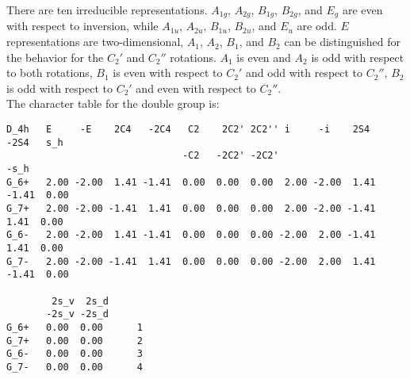 \documentclass[12pt,a4paper,twoside]{report}
\begin{document}
There are ten irreducible representations. $A_{1g}$, $A_{2g}$, $B_{1g}$, 
$B_{2g}$, and $E_g$ are even with respect to inversion, while 
$A_{1u}$, $A_{2u}$, $B_{1u}$, $B_{2u}$, and $E_u$ are odd.
$E$ representations are two-dimensional, $A_1$, $A_2$, $B_1$, and $B_2$ can
be distinguished for the behavior for the $C_2'$ and $C_2''$ rotations.
$A_1$ is even and $A_2$ is odd with respect to both rotations, 
$B_1$ is even with respect to $C_2'$ and odd with respect to $C_2''$,
$B_2$ is odd with respect to $C_2'$ and even with respect to $C_2''$. \\
The character table for the double group is:

\begin{tcolorbox}
\begin{scriptsize}
\begin{verbatim}
D_4h   E     -E    2C4   -2C4   C2    2C2' 2C2'' i     -i    2S4   -2S4   s_h 
                               -C2   -2C2' -2C2'                         -s_h 
G_6+   2.00 -2.00  1.41 -1.41  0.00  0.00  0.00  2.00 -2.00  1.41 -1.41  0.00
G_7+   2.00 -2.00 -1.41  1.41  0.00  0.00  0.00  2.00 -2.00 -1.41  1.41  0.00
G_6-   2.00 -2.00  1.41 -1.41  0.00  0.00  0.00 -2.00  2.00 -1.41  1.41  0.00
G_7-   2.00 -2.00 -1.41  1.41  0.00  0.00  0.00 -2.00  2.00  1.41 -1.41  0.00

        2s_v  2s_d
       -2s_v -2s_d
G_6+   0.00  0.00      1
G_7+   0.00  0.00      2
G_6-   0.00  0.00      3
G_7-   0.00  0.00      4
\end{verbatim}
\end{scriptsize}
\end{tcolorbox}
\end{document}
